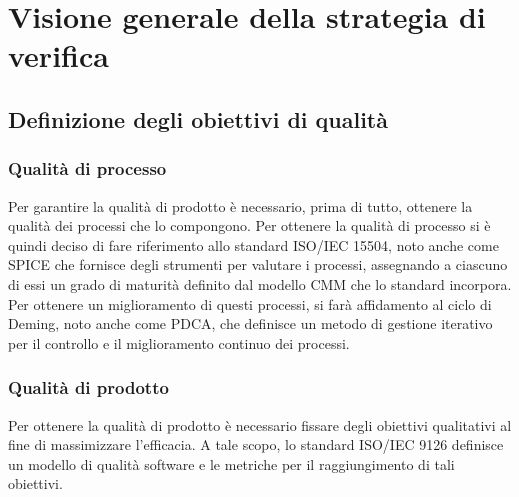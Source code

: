 

\section{Visione generale della strategia di verifica}

	\subsection{Definizione degli obiettivi di qualità}
	
		\subsubsection{Qualità di processo}
		Per garantire la qualità di prodotto è necessario, prima di tutto, ottenere la qualità dei processi che lo compongono. Per ottenere la qualità di processo si è quindi deciso di fare riferimento allo standard ISO/IEC 15504, noto anche come SPICE che fornisce degli strumenti per valutare i processi, assegnando a ciascuno di essi un grado di maturità definito dal modello CMM che lo standard incorpora.\\
		Per ottenere un miglioramento di questi processi, si farà affidamento al ciclo di Deming, noto anche come PDCA, che definisce un metodo di gestione iterativo per il controllo e il miglioramento continuo dei processi.
		
		\subsubsection{Qualità di prodotto}
		Per ottenere la qualità di prodotto è necessario fissare degli obiettivi qualitativi al fine di massimizzare l'efficacia. A tale scopo, lo standard ISO/IEC 9126 definisce un modello di qualità software e le metriche per il raggiungimento di tali obiettivi. 
		
